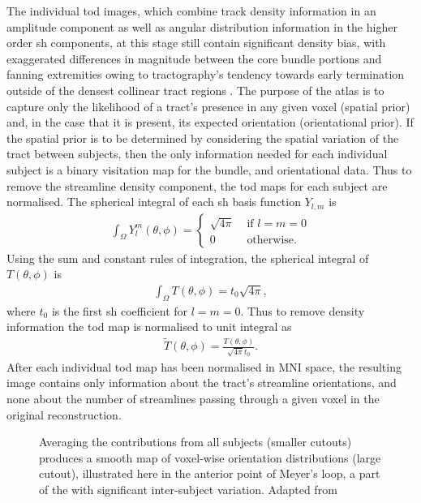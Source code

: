The individual \gls{tod} images, which combine track density information in an amplitude component as well as angular distribution information in the higher order \gls{sh} components, at this stage still contain significant density bias, with exaggerated differences in magnitude between the core bundle portions and fanning extremities owing to tractography's tendency towards early termination outside of the densest collinear tract regions \autocite{Smith2013,Calamante2015,Rheault2020}.
The purpose of the atlas is to capture only the likelihood of a tract's presence in any given voxel (spatial prior) and, in the case that it is present, its expected orientation (orientational prior).
If the spatial prior is to be determined by considering the spatial variation of the tract between subjects, then the only information needed for each individual subject is a binary visitation map for the bundle, and orientational data.
Thus to remove the streamline density component, the \gls{tod} maps for each subject are normalised.
The spherical integral of each \gls{sh} basis function $Y_{l,m}$ is
%
\begin{align}
  \int_{\Omega} Y^m_l(\theta, \phi) = \begin{cases}
   \sqrt{4\pi} & \text{ if } l=m=0\\
   0 & \text{ otherwise. }
  \end{cases}
\end{align}
%
Using the sum and constant rules of integration, the spherical integral of $T(\theta,\phi)$ is
%
\begin{align}
  \int_{\Omega} T(\theta,\phi) = t_0 \sqrt{4\pi},
\end{align}
%
where $t_0$ is the first \gls{sh} coefficient for $l=m=0$. Thus to remove density information the \gls{tod} map is normalised to unit integral as
%
\begin{align}
  \widetilde{T}(\theta, \phi) = \frac{T(\theta,\phi)}{\sqrt{4\pi} t_0}.
\end{align}
%
After each individual \gls{tod} map has been normalised in MNI space, the resulting image contains only information about the tract's streamline orientations, and none about the number of streamlines passing through a given voxel in the original reconstruction.

\begin{SCfigure}
  
  \caption[TOD averaging to create and atlas]{Averaging the  contributions from all subjects (smaller cutouts) produces a smooth map of voxel-wise orientation distributions (large cutout), illustrated here in the anterior point of Meyer's loop, a part of the  with significant inter-subject variation. Adapted from \textcite{Young2024}}
  \label{fig:todmean}
\end{SCfigure}

